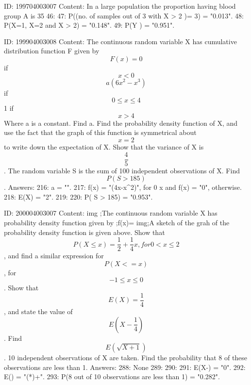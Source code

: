\documentclass{article}
\begin{document}
ID: 199704003007
Content:
In a large population the proportion having blood group A is 35%
46: 
47: P((no. of samples out of 3 with X > 2 )= 3) = "0.013".
48: P(X=1, X=2 and X > 2) = "0.148".
49: P(Y ) = "0.951".

ID: 199904003008
Content:
The continuous random variable X has cumulative distribution function F given by  $$F(x) = 0$$  if $$x < 0$$   $$a( 6x^{2} - x^{3})$$  if $$0 \leq x \leq 4$$ 1 if $$x > 4$$  Where a is a constant. Find a.  Find the probability density function of X, and use the fact that the graph of this function is symmetrical about $$x=2$$ to write down the expectation of X.  Show that the variance of X is $$\frac{4}{5}$$.  The random variable S is the sum of 100 independent observations of X. Find $$P(S > 185)$$. Answers:
216: a = "".
217: f(x) = "(4x-x^2)", for 0 \leq x  and f(x) = "0", otherwise.
218: E(X) = "2".
219: 
220: P( S > 185) = "0.953".

ID: 200004003007
Content:
img ;The continuous random variable X has probability density function given by ;f(x)= img;A sketch of the grah of the probability density function is given above. Show that $$P(X \leq x) = \frac{1}{2} + \frac{1}{4}x, for 0 < x \leq 2$$, and find a similar expression for $$P(X<=x)$$, for $$-1 \leq x \leq 0$$. Show that $$E(X) = \frac{1}{4}$$, and state the value of $$E(X - \frac{1}{4})$$. Find $$E(\sqrt{X+1})$$. 10 independent observations of X are taken. Find the probability that 8 of these observations are less than 1. Answers:
288: None
289: 
290: 
291: E(X-) = "0".
292: E() = "(*)+".
293: P(8 out of 10 observations are less than 1) = "0.282".
\end{document}

